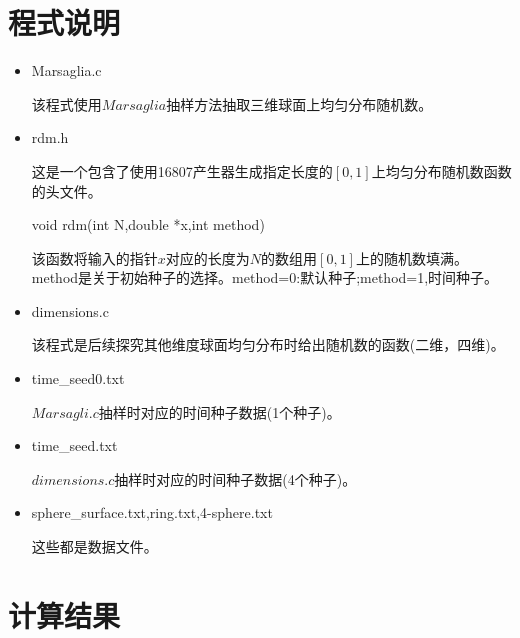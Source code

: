 \documentclass[UTF8]{ctexart}
\begin{document}
	\section{程式说明}
	\begin{itemize}
		\item Marsaglia.c
		
		该程式使用$Marsaglia$抽样方法抽取三维球面上均匀分布随机数。
		
		\item rdm.h
			
		这是一个包含了使用16807产生器生成指定长度的$[0,1]$上均匀分布随机数函数的头文件。
		
		\subitem void rdm(int N,double *x,int method)
		
		该函数将输入的指针$x$对应的长度为$N$的数组用$[0,1]$上的随机数填满。method是关于初始种子的选择。method=0:默认种子;method=1,时间种子。
		
		\item dimensions.c 
		
		该程式是后续探究其他维度球面均匀分布时给出随机数的函数(二维，四维)。
		
		\item time\_seed0.txt
		
		$Marsagli.c$抽样时对应的时间种子数据(1个种子)。
		
		\item time\_seed.txt
		
		$dimensions.c$抽样时对应的时间种子数据(4个种子)。
		
		\item sphere\_surface.txt,ring.txt,4-sphere.txt
		
		这些都是数据文件。
	\end{itemize}
	
	\section{计算结果}

	
\end{document}
